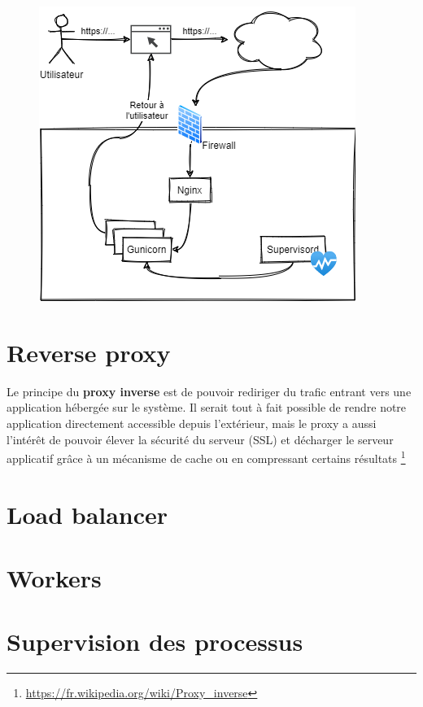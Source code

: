\documentclass[11pt]{amsbook}
\begin{document}
\begin{figure}[h]{}
\centering\includegraphics[width=2.5truein]{images/diagrams/architecture.png}


\end{figure}

\hypertarget{x-reverse-proxy}{\section{Reverse proxy}}
Le principe du \textbf{proxy inverse} est de pouvoir rediriger du trafic entrant vers une application hébergée sur le système.
Il serait tout à fait possible de rendre notre application directement accessible depuis l’extérieur, mais le proxy a aussi l’intérêt de pouvoir élever la sécurité du serveur (SSL) et décharger le serveur applicatif grâce à un mécanisme de cache ou en compressant certains résultats \footnote{\href{https://fr.wikipedia.org/wiki/Proxy_inverse}{https://fr.wikipedia.org/wiki/Proxy\_inverse}}


\hypertarget{x-load-balancer}{\section{Load balancer}}

\hypertarget{x-workers}{\section{Workers}}

\hypertarget{x-supervision-des-processus}{\section{Supervision des processus}}
\end{document}
